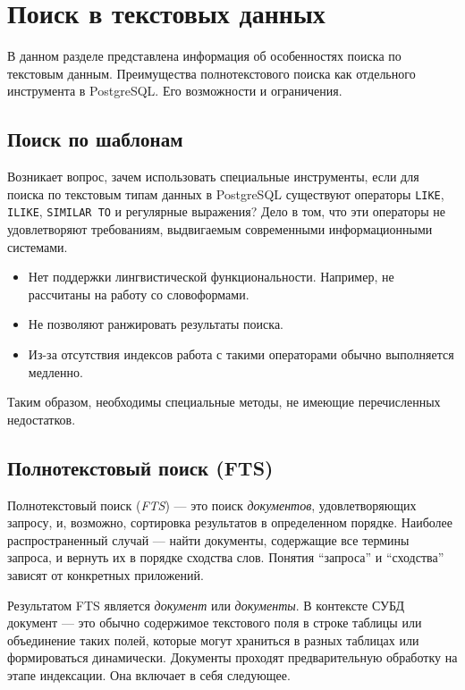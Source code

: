 
\section{Поиск в текстовых данных}

В данном разделе представлена информация об особенностях поиска по текстовым данным.
Преимущества полнотекстового поиска как отдельного инструмента в PostgreSQL. Его возможности и ограничения.

\subsection{Поиск по шаблонам}

Возникает вопрос, зачем использовать специальные инструменты, если для поиска по текстовым типам данных в PostgreSQL существуют операторы \texttt{LIKE}, \texttt{ILIKE}, \texttt{SIMILAR TO} и регулярные выражения?
Дело в том, что эти операторы не удовлетворяют требованиям, выдвигаемым современными информационными системами.

\begin{itemize}
    \item Нет поддержки лингвистической функциональности. Например, не рассчитаны на работу со словоформами.
    \item Не позволяют ранжировать результаты поиска.
    \item Из-за отсутствия индексов работа с такими операторами обычно выполняется медленно.
\end{itemize}

Таким образом, необходимы специальные методы, не имеющие перечисленных недостатков.

\subsection{Полнотекстовый поиск (FTS)}

Полнотекстовый поиск (\textit{FTS}) --- это поиск \textit{документов}, удовлетворяющих запросу, и, возможно, сортировка результатов в определенном порядке.
Наиболее распространенный случай --- найти документы, содержащие все термины запроса, и вернуть их в порядке сходства слов.
Понятия \enquote{запроса} и \enquote{сходства} зависят от конкретных приложений.

Результатом FTS является \textit{документ} или \textit{документы}.
В контексте СУБД документ --- это обычно содержимое текстового поля в строке таблицы или объединение таких полей, которые могут храниться в разных таблицах или формироваться динамически.
Документы проходят предварительную обработку на этапе индексации. Она включает в себя следующее.

